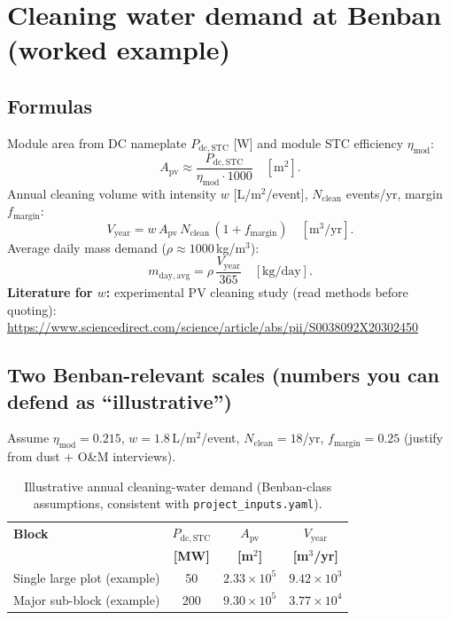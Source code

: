 \documentclass[11pt,a4paper]{article}
\begin{document}
\section{Cleaning water demand at Benban (worked example)}

\subsection{Formulas}
Module area from DC nameplate $P_{\mathrm{dc,STC}}$ [W] and module STC efficiency $\eta_{\mathrm{mod}}$:
\begin{equation}
A_{\mathrm{pv}} \approx \frac{P_{\mathrm{dc,STC}}}{\eta_{\mathrm{mod}}\cdot 1000}\quad[\mathrm{m^2}].
\end{equation}
Annual cleaning volume with intensity $w$ [L/m$^2$/event], $N_{\mathrm{clean}}$ events/yr, margin $f_{\mathrm{margin}}$:
\begin{equation}
V_{\mathrm{year}} = w\,A_{\mathrm{pv}}\,N_{\mathrm{clean}}\,(1+f_{\mathrm{margin}})\quad[\mathrm{m^3/yr}].
\end{equation}
Average daily mass demand ($\rho\approx 1000$\,kg/m$^3$):
\begin{equation}
m_{\mathrm{day,avg}}=\rho\,\frac{V_{\mathrm{year}}}{365}\quad[\mathrm{kg/day}].
\end{equation}
\textbf{Literature for $w$:} experimental PV cleaning study (read methods before quoting):\\
\url{https://www.sciencedirect.com/science/article/abs/pii/S0038092X20302450}

\subsection{Two Benban-relevant scales (numbers you can defend as ``illustrative'')}
Assume $\eta_{\mathrm{mod}}=0.215$, $w=1.8$\,L/m$^2$/event, $N_{\mathrm{clean}}=18$/yr, $f_{\mathrm{margin}}=0.25$ (justify from dust + O\&M interviews).

\begin{table}[h]
\centering
\caption{Illustrative annual cleaning-water demand (Benban-class assumptions, consistent with \texttt{project\_inputs.yaml}).}
\begin{tabular}{@{}lccc@{}}
\toprule
\textbf{Block} & $P_{\mathrm{dc,STC}}$ & $A_{\mathrm{pv}}$ & $V_{\mathrm{year}}$ \\
 & \textbf{[MW]} & \textbf{[m$^2$]} & \textbf{[m$^3$/yr]} \\
\midrule
Single large plot (example) & 50  & $2.33\times 10^5$ & $9.42\times 10^3$ \\
Major sub-block (example)   & 200 & $9.30\times 10^5$ & $3.77\times 10^4$ \\
\bottomrule
\end{tabular}
\end{table}
\end{document}
